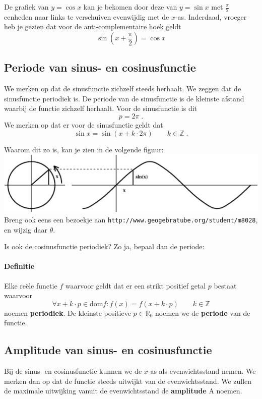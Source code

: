 \documentclass[a4paper,12pt]{article}
\begin{document}
De grafiek van $y=\cos x$ kan je bekomen door deze van $y=\sin x$ met $\frac{\pi}{2}$ eenheden naar links te verschuiven evenwijdig met de $x$-as. Inderdaad, vroeger heb je gezien dat voor de anti-complementaire hoek geldt
$$\sin(x+\dfrac{\pi}{2})=\cos x$$

\subsection{Periode van sinus- en cosinusfunctie}

We merken op dat de sinusfunctie zichzelf steeds herhaalt. We zeggen dat de sinusfunctie periodiek is. De periode van de sinusfunctie is de kleinste afstand waarbij de functie zichzelf herhaalt. Voor de sinusfunctie is dit 
$$p=2\pi\;.$$
We merken op dat er voor de sinusfunctie geldt dat
$$ \sin x = \sin (x+k\cdot 2\pi)\qquad k\in\mathbb{Z}\;.$$

Waarom dit zo is, kan je zien in de volgende figuur:\\
\includegraphics[width=\textwidth]{goniometriccircle_sine}
Breng ook eens een bezoekje aan \verb#http://www.geogebratube.org/student/m8028#, en wijzig daar $\theta$.

\begin{oefening}
Is ook de cosinusfunctie periodiek? Zo ja, bepaal dan de periode:
\end{oefening}

\paragraph{Definitie}
\begin{mdframed}
Elke reële functie $f$ waarvoor geldt dat er een strikt positief getal $p$ bestaat waarvoor
$$\forall x+k\cdot p \in \mbox{dom} f: f(x)=f(x+k\cdot p)\qquad k\in\mathbb{Z}$$
noemen {\bf periodiek}. De kleinste positieve $p\in\mathbb{R}_0$ noemen we de {\bf periode} van de functie.
\end{mdframed}

\subsection{Amplitude van sinus- en cosinusfunctie}
Bij de sinus- en cosinusfunctie kunnen we de $x$-as als evenwichtsstand nemen. We merken dan op dat de functie steeds uitwijkt van de evenwichtsstand. We zullen de maximale uitwijking vanuit de evenwichtsstand de {\bf amplitude} A noemen.
\end{document}
